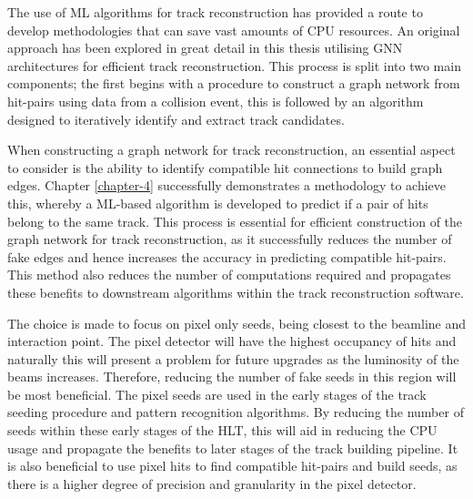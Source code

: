 The use of ML algorithms for track reconstruction has provided a route to develop methodologies that can save vast amounts of CPU resources. An original approach has been explored in great detail in this thesis utilising GNN architectures for efficient track reconstruction. This process is split into two main components; the first begins with a procedure to construct a graph network from hit-pairs using data from a collision event, this is followed by an algorithm designed to iteratively identify and extract track candidates. 



When constructing a graph network for track reconstruction, an essential aspect to consider is the ability to identify compatible hit connections to build graph edges. Chapter \ref{chapter-4} successfully demonstrates a methodology to achieve this, whereby a ML-based algorithm is developed to predict if a pair of hits belong to the same track. This process is essential for efficient construction of the graph network for track reconstruction, as it successfully reduces the number of fake edges and hence increases the accuracy in predicting compatible hit-pairs. This method also reduces the number of computations required and propagates these benefits to downstream algorithms within the track reconstruction software.

The choice is made to focus on pixel only seeds, being closest to the beamline and interaction point. The pixel detector will have the highest occupancy of hits and naturally this will present a problem for future upgrades as the luminosity of the beams increases. Therefore, reducing the number of fake seeds in this region will be most beneficial. The pixel seeds are used in the early stages of the track seeding procedure and pattern recognition algorithms. By reducing the number of seeds within these early stages of the HLT, this will aid in reducing the CPU usage and propagate the benefits to later stages of the track building pipeline. It is also beneficial to use pixel hits to find compatible hit-pairs and build seeds, as there is a higher degree of precision and granularity in the pixel detector.

